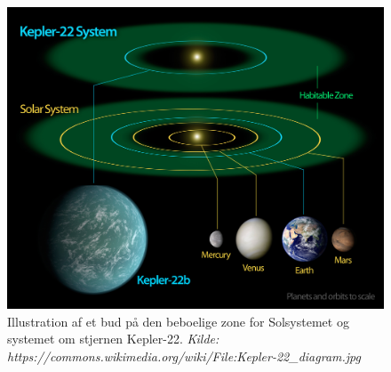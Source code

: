 \begin{figure}[h!]
    \centering
    \includegraphics[width=.6\textwidth]{Astrofysik/billeder/Kepler-22_diagram.jpg}
    \caption{Illustration af et bud på den beboelige zone for Solsystemet og systemet om stjernen Kepler-22. 
    \textit{Kilde: https://commons.wikimedia.org/wiki/File:Kepler-22\_diagram.jpg}} %
    \label{fig:HZ}
\end{figure}

